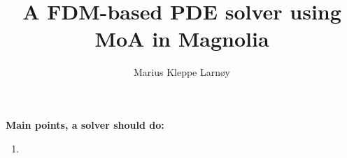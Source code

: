 \documentclass{article}
\author{Marius Kleppe Larnøy}
\begin{document}
\title{A FDM-based PDE solver using MoA in Magnolia}
\maketitle

\noindent \textbf{Main points, a solver should do:}
\begin{enumerate}
    \item
\end{enumerate}
\end{document}
